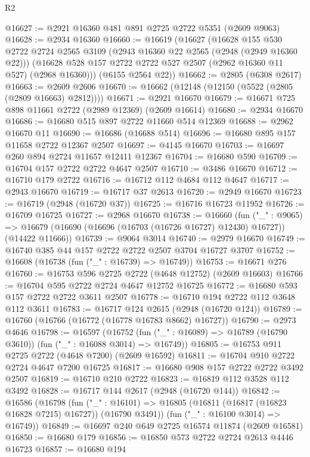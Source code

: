 \begin{lexlean}{R2}
\begin{coremodule}
@16627 := @2921 @16360 @481 @891 @2725 @2722 @5351 (@2609 @9063)
@16628 := @2934 @16360
@16660 := @16619
    (@16627
      (@16628
        @155
        @530
        @2722
        @2724
        @2565
        @3109
        (@2943 @16360 @22 @2565 (@2948 (@2949 @16360 @22)))
        (@16628 @528 @157 @2722 @2722 @527 @2507 (@2962 @16360 @11 @527) (@2968 @16360)))
      (@6155 @2564 @22))
@16662 := @2805 (@6308 @2617)
@16663 := @2609 @2606
@16670 := @16662 (@12148 (@12150 (@5522 (@2805 (@2809 @16663) @2812))))
@16671 := @2921 @16670
@16679 := @16671 @725 @898 @11661 @2722 (@2989 @12369) (@2609 @16614)
@16680 := @2934 @16670
@16686 := @16680 @515 @897 @2722 @11660 @514 @12369
@16688 := @2962 @16670 @11
@16690 := @16686 (@16688 @514)
@16696 := @16680 @895 @157 @11658 @2722 @12367 @2507
@16697 := @4145 @16670
@16703 := @16697 @260 @894 @2724 @11657 @12411 @12367
@16704 := @16680 @590
@16709 := @16704 @157 @2722 @2722 @4647 @2507
@16710 := @3486 @16670
@16712 := @16710 @179 @2722
@16716 := @16712 @112 @4684 @112 @4647
@16717 := @2943 @16670
@16719 := @16717 @37 @2613
@16720 := @2949 @16670
@16723 := @16719 (@2948 (@16720 @37))
@16725 := @16716 @16723 @11952
@16726 := @16709 @16725
@16727 := @2968 @16670
@16738 := @16660
    (fun ("_" : @9065) =>
    @16679 (@16690 (@16696 (@16703 (@16726 @16727) @12430) @16727)) (@14422 @11666))
@16739 := @9064 @3014
@16740 := @2979 @16670
@16749 := @16740 @385 @44 @157 @2722 @2722 @2507 @3704 @16727 @3707
@16752 := @16608 (@16738 (fun ("_" : @16739) => @16749))
@16753 := @16671 @276
@16760 := @16753 @596 @2725 @2722 (@4648 @12752) (@2609 @16603)
@16766 := @16704 @595 @2722 @2724 @4647 @12752 @16725
@16772 := @16680 @593 @157 @2722 @2722 @3611 @2507
@16778 := @16710 @194 @2722 @112 @3648 @112 @3611
@16783 := @16717 @124 @2615 (@2948 (@16720 @124))
@16789 := @16760 (@16766 (@16772 (@16778 @16783 @8662) @16727))
@16790 := @2973 @4646
@16798 := @16597
    (@16752 (fun ("_" : @16089) => @16789 (@16790 @3610)) (fun ("_" : @16088 @3014) => @16749))
@16805 := @16753 @911 @2725 @2722 (@4648 @7200) (@2609 @16592)
@16811 := @16704 @910 @2722 @2724 @4647 @7200 @16725
@16817 := @16680 @908 @157 @2722 @2722 @3492 @2507
@16819 := @16710 @210 @2722
@16823 := @16819 @112 @3528 @112 @3492
@16828 := @16717 @144 @2617 (@2948 (@16720 @144))
@16842 := @16586
    (@16798
      (fun ("_" : @16101) => @16805 (@16811 (@16817 (@16823 @16828 @7215) @16727)) (@16790 @3491))
      (fun ("_" : @16100 @3014) => @16749))
@16849 := @16697 @240 @649 @2725 @16574 @11874 (@2609 @16581)
@16850 := @16680 @179
@16856 := @16850 @573 @2722 @2724 @2613 @4446 @16723
@16857 := @16680 @194

\end{coremodule}
\end{lexlean}
